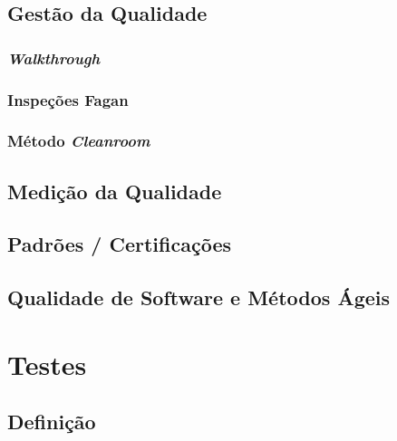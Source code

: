 \documentclass[
	12pt,				%
	openright,			%
	twoside,			%
	a4paper,			%
	english,			%
	brazil,				%
	]{abntex2}
\begin{document}
\section{Gestão da Qualidade}


\subsection{\emph{Walkthrough}}


\subsection{Inspeções Fagan}


\subsection{Método \emph{Cleanroom}}

\section{Medição da Qualidade}

\section{Padrões / Certificações}

\section{Qualidade de Software e Métodos Ágeis}


\chapter{Testes}

\section{Definição}
\end{document}
